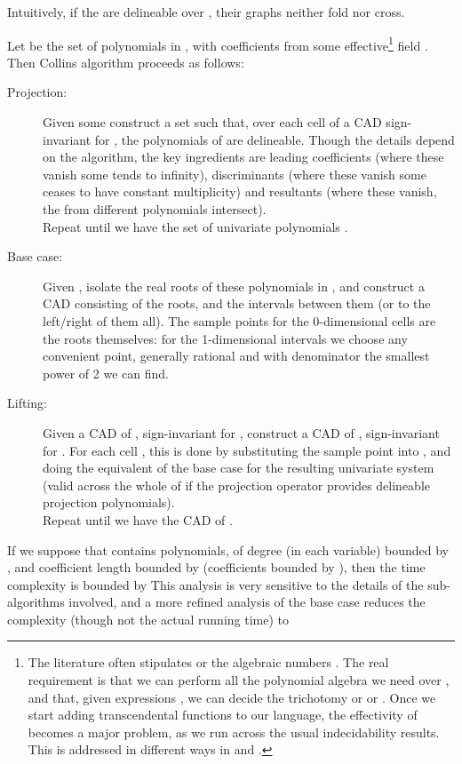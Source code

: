 \documentclass[runningheads,a4paper]{llncs}
\begin{document}
Intuitively, if the  are delineable over , their graphs neither fold nor cross.
\par
Let  be the set of polynomials in , with coefficients from some effective\footnote{The literature often stipulates  or the algebraic numbers . The real requirement is that we can perform all the polynomial algebra we need over , and that, given expressions , we can decide the trichotomy  or  or . Once we start adding transcendental functions to our language, the effectivity of  becomes a major problem, as we run across the usual indecidability results. This is addressed in different ways in \cite{Achatzetal2008} and \cite{Vorobjov1989,Vorobjov1992}.} field .  Then Collins algorithm proceeds as follows:
\begin{description}
\item[Projection:] Given some  construct a set  such that, over each cell of a CAD sign-invariant for , the polynomials of  are delineable. Though the details depend on the algorithm, the key ingredients are leading coefficients (where these vanish some  tends to infinity), discriminants (where these vanish some  ceases to have constant multiplicity)  and resultants (where these vanish, the   from different polynomials intersect).  
\\
Repeat until we have the set of univariate polynomials .
\item[Base case:] Given , isolate the  real roots of these polynomials in , and construct a CAD consisting of the  roots, and the  intervals between them (or to the left/right of them all). The sample points for the 0-dimensional cells are the roots themselves: for the 1-dimensional intervals we choose any convenient point, generally rational and with denominator the smallest power of 2 we can find.
\item[Lifting:] Given a CAD  of , sign-invariant for , construct a CAD  of , sign-invariant for . For each cell , this is done by substituting the sample point  into , and doing the equivalent of the base case for the resulting univariate system (valid across the whole of  if the projection operator provides delineable projection polynomials).
\\
Repeat until we have the CAD  of .
\end{description}
If we suppose that  contains  polynomials, of degree (in each variable) bounded by , and coefficient length bounded by  (coefficients bounded by ), then the time  complexity is bounded  \cite[Theorem 16]{Collins1975} by
\def\foo#1#2{\hbox to 0pt{/\hskip-6pt}#1{#2}}This analysis is very sensitive to the details of the sub-algorithms involved, and a more refined analysis of the base case \cite{Davenport1985c} reduces the complexity (though not the actual running time) to 
\end{document}
